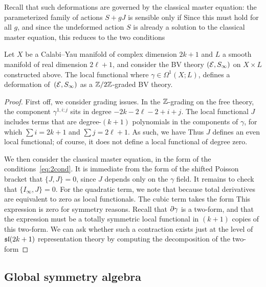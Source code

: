 \documentclass[11pt]{amsart}
\begin{document}
Recall that such deformations are governed by the classical master equation: the parameterized family of actions $S + g J$ is sensible only if 
Since this must hold for all $g$, and since the undeformed action $S$ is already a solution to the classical master equation, this reduces to the two conditions 
\begin{thm}
  Let $X$ be a Calabi--Yau manifold of complex dimension $2k+1$ and $L$ a smooth manifold of real dimension $2\ell + 1$, and consider the BV theory $(\mathcal E, S_\infty)$ on $X \times L$ constructed above. The local functional 
  where $\gamma \in \Omega^1(X;L)$, defines a deformation of~$(\mathcal E,S_\infty)$ as a $\mathbb{Z}/2\mathbb{Z}$-graded BV theory.
\end{thm}
\begin{proof}
  First off, we consider grading issues. In the $\mathbb{Z}$-grading on the free theory, the component $\gamma^{1,i;j}$ sits in degree $-2k-2\ell -2+i+j$. The local functional $J$ includes terms that are degree-$(k+1)$ polynomials in the components of $\gamma$, for which $\sum i = 2k+1$ and $\sum j = 2\ell + 1$. As such, we have
  Thus $J$ defines an even local functional; of course, it does not define a local functional of degree zero.

  We then consider the classical master equation, in the form of the conditions~\eqref{eq:2cond}. It is immediate from the form of the shifted Poisson bracket that $\{J,J\} = 0$, since $J$ depends only on the $\gamma$ field. It remains to check that $\{I_\infty,J\} = 0$. For the quadratic term, we note that 
  because total derivatives are equivalent to zero as local functionals. The cubic term takes the form
This expression is zero for symmetry reasons. Recall that $\partial\gamma$ is a two-form, and that the expression must be a totally symmetric local functional in $(k+1)$ copies of this two-form. We can ask whether such a  contraction exists just at the level of $\mathfrak{sl}(2k+1)$ representation theory by computing the decomposition of the two-form  
\end{proof}

\subsection{Global symmetry algebra}
\end{document}
